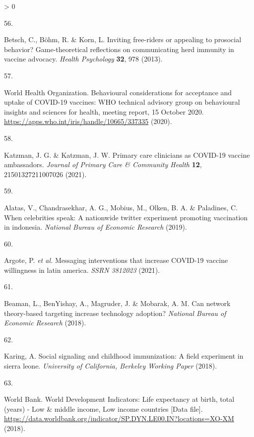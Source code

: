 \documentclass[
  12pt,
]{article}
\newlength{\cslhangindent}
\newlength{\csllabelwidth}
\newenvironment{CSLReferences}[2] %
 {%
  \setlength{\parindent}{0pt}
  \ifodd #1 \everypar{\setlength{\hangindent}{\cslhangindent}}\ignorespaces\fi
  \ifnum #2 > 0
  \setlength{\parskip}{#2\baselineskip}
  \fi
 }%
 {}
\newcommand{\CSLLeftMargin}[1]{\parbox[t]{\csllabelwidth}{#1}}
\newcommand{\CSLRightInline}[1]{\parbox[t]{\linewidth - \csllabelwidth}{#1}\break}
\begin{document}
\begin{CSLReferences}{0}{0}
\leavevmode\hypertarget{ref-betsch2013inviting}{}%
\CSLLeftMargin{56. }
\CSLRightInline{Betsch, C., Böhm, R. \& Korn, L. Inviting free-riders or appealing to prosocial behavior? Game-theoretical reflections on communicating herd immunity in vaccine advocacy. \emph{Health Psychology} \textbf{32}, 978 (2013).}

\leavevmode\hypertarget{ref-who2020behavioral}{}%
\CSLLeftMargin{57. }
\CSLRightInline{World Health Organization. {Behavioural considerations for acceptance and uptake of COVID-19 vaccines: WHO technical advisory group on behavioural insights and sciences for health, meeting report, 15 October 2020}. \url{https://apps.who.int/iris/handle/10665/337335} (2020).}

\leavevmode\hypertarget{ref-katzman2021primary}{}%
\CSLLeftMargin{58. }
\CSLRightInline{Katzman, J. G. \& Katzman, J. W. Primary care clinicians as COVID-19 vaccine ambassadors. \emph{Journal of Primary Care \& Community Health} \textbf{12}, 21501327211007026 (2021).}

\leavevmode\hypertarget{ref-alatas2019celebrities}{}%
\CSLLeftMargin{59. }
\CSLRightInline{Alatas, V., Chandrasekhar, A. G., Mobius, M., Olken, B. A. \& Paladines, C. When celebrities speak: A nationwide twitter experiment promoting vaccination in indonesia. \emph{National Bureau of Economic Research} (2019).}

\leavevmode\hypertarget{ref-argote2021messaging}{}%
\CSLLeftMargin{60. }
\CSLRightInline{Argote, P. \emph{et al.} Messaging interventions that increase COVID-19 vaccine willingness in latin america. \emph{SSRN 3812023} (2021).}

\leavevmode\hypertarget{ref-beaman2021can}{}%
\CSLLeftMargin{61. }
\CSLRightInline{Beaman, L., BenYishay, A., Magruder, J. \& Mobarak, A. M. Can network theory-based targeting increase technology adoption? \emph{National Bureau of Economic Research} (2018).}

\leavevmode\hypertarget{ref-karing2018social}{}%
\CSLLeftMargin{62. }
\CSLRightInline{Karing, A. Social signaling and childhood immunization: A field experiment in sierra leone. \emph{University of California, Berkeley Working Paper} (2018).}

\leavevmode\hypertarget{ref-wbage}{}%
\CSLLeftMargin{63. }
\CSLRightInline{World Bank. {World Development Indicators: Life expectancy at birth, total (years) - Low \& middle income, Low income countries {[}Data file{]}}. \url{https://data.worldbank.org/indicator/SP.DYN.LE00.IN?locations=XO-XM} (2018).}


\end{CSLReferences}
\end{document}
